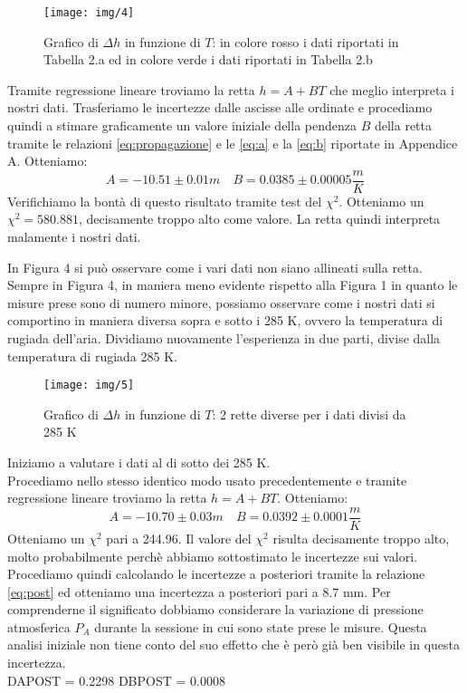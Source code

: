 \begin{figure}[H]
\centering
\texttt{[image: img/4]}
\caption{Grafico di $\Delta h$ in funzione di $T$: in colore rosso i dati riportati in Tabella 2.a ed in colore verde i dati riportati in Tabella 2.b }
\end{figure}

Tramite regressione lineare troviamo la retta $h = A+BT$ che meglio interpreta i nostri dati. 
Trasferiamo le incertezze dalle ascisse alle ordinate e procediamo quindi a stimare graficamente un valore iniziale della pendenza $B$ della retta tramite le relazioni \eqref{eq:propagazione} e le \eqref{eq:a} e la \eqref{eq:b} riportate in Appendice A.
Otteniamo:
\[A = -10.51 \pm 0.01 m \quad  B = 0.0385 \pm 0.00005\frac{m}{K} \]
Verifichiamo la bontà di questo risultato tramite test del $\chi^2$. 
Otteniamo un $\chi^2 = 580.881$, decisamente troppo alto come valore.
La retta quindi interpreta malamente i nostri dati. 



In Figura 4 si può osservare come i vari dati non siano allineati sulla retta. 
Sempre in Figura 4, in maniera meno evidente rispetto alla Figura 1 in quanto le misure prese sono di numero minore, possiamo osservare come i nostri dati si comportino in maniera diversa sopra e sotto i 285 K, ovvero la temperatura di rugiada dell'aria. 
\newline
Dividiamo nuovamente l'esperienza in due parti, divise dalla temperatura di rugiada 285 K.

\begin{figure}[H]
\centering
\texttt{[image: img/5]}
\caption{Grafico di $\Delta h$ in funzione di $T$: 2 rette diverse per i dati divisi da 285 K}
\end{figure}

Iniziamo a valutare i dati al di sotto dei 285 K.\\
Procediamo nello stesso identico modo usato precedentemente e tramite regressione lineare troviamo la retta $h = A+BT$.
Otteniamo:
\[A = -10.70 \pm 0.03 m \quad  B = 0.0392 \pm 0.0001\frac{m}{K}\]
Otteniamo un $\chi^2$ pari a 244.96. 
Il valore del $\chi^2$ risulta decisamente troppo alto, molto probabilmente perchè abbiamo sottostimato le incertezze sui valori.
Procediamo quindi calcolando le incertezze a posteriori tramite la relazione \eqref{eq:post} ed otteniamo una incertezza a posteriori pari a $ 8.7 $ mm. 
Per comprenderne il significato dobbiamo considerare la variazione di pressione atmosferica $P_A$ durante la sessione in cui sono state prese le misure. 
Questa analisi iniziale non tiene conto del suo effetto che è però già ben visibile in questa incertezza.\\
DAPOST = 0.2298
DBPOST = 0.0008


